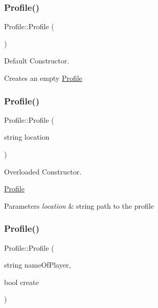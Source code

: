 \subsubsection{\texorpdfstring{Profile()}{Profile()}\hspace{0.1cm}{\footnotesize\ttfamily [1/3]}}
{\footnotesize\ttfamily Profile\+::\+Profile (\begin{DoxyParamCaption}{ }\end{DoxyParamCaption})}



Default Constructor. 

Creates an empty \hyperlink{class_profile}{Profile} \hypertarget{class_profile_a2f1ced1b7bf7fc6d54468f645ba9899c}{}\label{class_profile_a2f1ced1b7bf7fc6d54468f645ba9899c} 
\subsubsection{\texorpdfstring{Profile()}{Profile()}\hspace{0.1cm}{\footnotesize\ttfamily [2/3]}}
{\footnotesize\ttfamily Profile\+::\+Profile (\begin{DoxyParamCaption}\item[{string}]{location }\end{DoxyParamCaption})}



Overloaded Constructor. 

\hyperlink{class_profile}{Profile}


\begin{DoxyParams}{Parameters}
{\em location} & string path to the profile \\
\hline
\end{DoxyParams}
\hypertarget{class_profile_a69b3d3c58a1db8e6edeea0c48f40ab4b}{}\label{class_profile_a69b3d3c58a1db8e6edeea0c48f40ab4b} 
\subsubsection{\texorpdfstring{Profile()}{Profile()}\hspace{0.1cm}{\footnotesize\ttfamily [3/3]}}
{\footnotesize\ttfamily Profile\+::\+Profile (\begin{DoxyParamCaption}\item[{string}]{name\+Of\+Player,  }\item[{bool}]{create }\end{DoxyParamCaption})}



